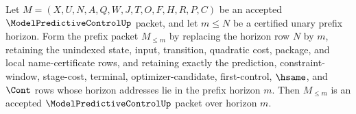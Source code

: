 \begin{theorem}
\label{thm:modelpredictivecontrol-finite-horizon-prefix-restriction}
Let $M=(X,U,N,A,Q,W,J,T,O,F,H,R,P,C)$ be an accepted
$\ModelPredictiveControlUp$ packet, and let $m\leq N$ be a certified unary
prefix horizon. Form the prefix packet $M_{\leq m}$ by replacing the horizon
row $N$ by $m$, retaining the unindexed state, input, transition, quadratic
cost, package, and local name-certificate rows, and retaining exactly the
prediction, constraint-window, stage-cost, terminal, optimizer-candidate,
first-control, $\hsame$, and $\Cont$ rows whose horizon addresses lie in the
prefix horizon $m$. Then $M_{\leq m}$ is an accepted
$\ModelPredictiveControlUp$ packet over horizon $m$.
\end{theorem}
